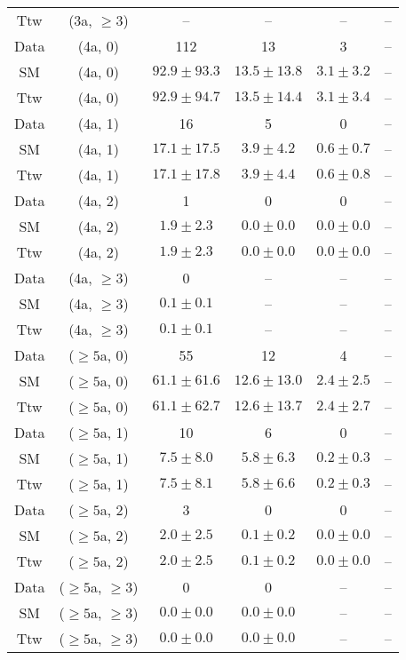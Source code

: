 \begin{table}[h!]
{\begin{tabular}{cccccc}
	Ttw & (3a, $\ge3$) & -- & -- & -- & -- \\[0.5ex] 
	Data & (4a, 0) & 112 & 13 & 3 & -- \\[0.5ex] 
	SM & (4a, 0) & $92.9\pm 93.3$ & $13.5\pm 13.8$ & $3.1\pm 3.2$ & -- \\[0.5ex] 
	Ttw & (4a, 0) & $92.9\pm 94.7$ & $13.5\pm 14.4$ & $3.1\pm 3.4$ & -- \\[0.5ex] 
	Data & (4a, 1) & 16 & 5 & 0 & -- \\[0.5ex] 
	SM & (4a, 1) & $17.1\pm 17.5$ & $3.9\pm 4.2$ & $0.6\pm 0.7$ & -- \\[0.5ex] 
	Ttw & (4a, 1) & $17.1\pm 17.8$ & $3.9\pm 4.4$ & $0.6\pm 0.8$ & -- \\[0.5ex] 
	Data & (4a, 2) & 1 & 0 & 0 & -- \\[0.5ex] 
	SM & (4a, 2) & $1.9\pm 2.3$ & $0.0\pm 0.0$ & $0.0\pm 0.0$ & -- \\[0.5ex] 
	Ttw & (4a, 2) & $1.9\pm 2.3$ & $0.0\pm 0.0$ & $0.0\pm 0.0$ & -- \\[0.5ex] 
	Data & (4a, $\ge3$) & 0 & -- & -- & -- \\[0.5ex] 
	SM & (4a, $\ge3$) & $0.1\pm 0.1$ & -- & -- & -- \\[0.5ex] 
	Ttw & (4a, $\ge3$) & $0.1\pm 0.1$ & -- & -- & -- \\[0.5ex] 
	Data & ($\ge5$a, 0) & 55 & 12 & 4 & -- \\[0.5ex] 
	SM & ($\ge5$a, 0) & $61.1\pm 61.6$ & $12.6\pm 13.0$ & $2.4\pm 2.5$ & -- \\[0.5ex] 
	Ttw & ($\ge5$a, 0) & $61.1\pm 62.7$ & $12.6\pm 13.7$ & $2.4\pm 2.7$ & -- \\[0.5ex] 
	Data & ($\ge5$a, 1) & 10 & 6 & 0 & -- \\[0.5ex] 
	SM & ($\ge5$a, 1) & $7.5\pm 8.0$ & $5.8\pm 6.3$ & $0.2\pm 0.3$ & -- \\[0.5ex] 
	Ttw & ($\ge5$a, 1) & $7.5\pm 8.1$ & $5.8\pm 6.6$ & $0.2\pm 0.3$ & -- \\[0.5ex] 
	Data & ($\ge5$a, 2) & 3 & 0 & 0 & -- \\[0.5ex] 
	SM & ($\ge5$a, 2) & $2.0\pm 2.5$ & $0.1\pm 0.2$ & $0.0\pm 0.0$ & -- \\[0.5ex] 
	Ttw & ($\ge5$a, 2) & $2.0\pm 2.5$ & $0.1\pm 0.2$ & $0.0\pm 0.0$ & -- \\[0.5ex] 
	Data & ($\ge5$a, $\ge3$) & 0 & 0 & -- & -- \\[0.5ex] 
	SM & ($\ge5$a, $\ge3$) & $0.0\pm 0.0$ & $0.0\pm 0.0$ & -- & -- \\[0.5ex] 
	Ttw & ($\ge5$a, $\ge3$) & $0.0\pm 0.0$ & $0.0\pm 0.0$ & -- & -- \\[0.5ex] 
	\hline
	\hline
\end{tabular}}
\end{table}
